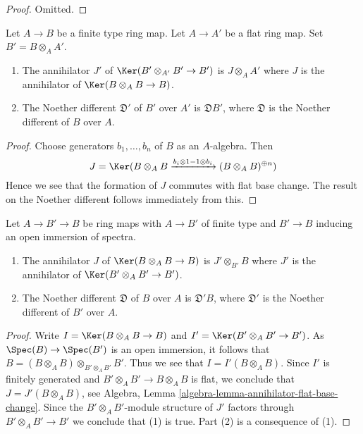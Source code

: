 \begin{proof}
Omitted.
\end{proof}

\begin{lemma}
\label{lemma-noether-different-base-change}
Let $A \to B$ be a finite type ring map. Let $A \to A'$ be a flat ring map.
Set $B' = B \otimes_A A'$.
\begin{enumerate}
\item The annihilator $J'$ of $\Ker(B' \otimes_{A'} B' \to B')$ is
$J \otimes_A A'$ where $J$ is the annihilator of $\Ker(B \otimes_A B \to B)$.
\item The Noether different $\mathfrak{D}'$ of $B'$ over $A'$ is
$\mathfrak{D}B'$, where $\mathfrak{D}$ is
the Noether different of $B$ over $A$.
\end{enumerate}
\end{lemma}

\begin{proof}
Choose generators $b_1, \ldots, b_n$ of $B$ as an $A$-algebra.
Then
$$
J = \Ker(B \otimes_A B \xrightarrow{b_i \otimes 1 - 1 \otimes b_i}
(B \otimes_A B)^{\oplus n})
$$
Hence we see that the formation of $J$ commutes with flat base change.
The result on the Noether different follows immediately from this.
\end{proof}

\begin{lemma}
\label{lemma-noether-different-localization}
Let $A \to B' \to B$ be ring maps with $A \to B'$
of finite type and $B' \to B$ inducing an open immersion of spectra.
\begin{enumerate}
\item The annihilator $J$ of $\Ker(B \otimes_A B \to B)$ is
$J' \otimes_{B'} B$ where $J'$ is the annihilator of
$\Ker(B' \otimes_A B' \to B')$.
\item The Noether different $\mathfrak{D}$ of $B$ over $A$ is
$\mathfrak{D}'B$, where $\mathfrak{D}'$ is
the Noether different of $B'$ over $A$.
\end{enumerate}
\end{lemma}

\begin{proof}
Write $I = \Ker(B \otimes_A B \to B)$ and $I' = \Ker(B' \otimes_A B' \to B')$.
As $\Spec(B) \to \Spec(B')$ is an open immersion, it follows that
$B = (B \otimes_A B) \otimes_{B' \otimes_A B'} B'$. Thus we see that
$I = I'(B \otimes_A B)$. Since $I'$ is finitely generated and
$B' \otimes_A B' \to B \otimes_A B$ is flat, we conclude that
$J = J'(B \otimes_A B)$, see
Algebra, Lemma \ref{algebra-lemma-annihilator-flat-base-change}.
Since the $B' \otimes_A B'$-module structure of $J'$
factors through $B' \otimes_A B' \to B'$ we conclude that (1) is true.
Part (2) is a consequence of (1).
\end{proof}

